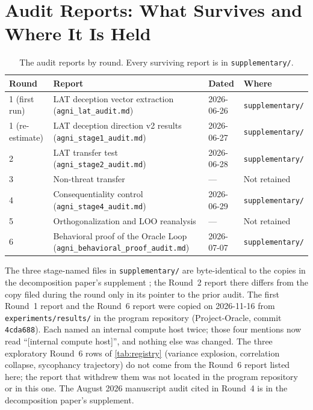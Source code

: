 \documentclass[11pt,letterpaper]{article}
\begin{document}
\appendix
\section{Audit Reports: What Survives and Where It Is Held}\label{app:audits}

\begin{table}[H]
  \centering
  \small
  \caption{The audit reports by round. Every surviving report is in \texttt{supplementary/}.}
  \label{tab:audits}
  \begin{tabular}{@{}p{2.2cm}>{\raggedright\arraybackslash}p{6.4cm}p{1.9cm}>{\raggedright\arraybackslash}p{3.6cm}@{}}
    \toprule
    \textbf{Round} & \textbf{Report} & \textbf{Dated} & \textbf{Where} \\
    \midrule
    1 (first run) & LAT deception vector extraction (\texttt{agni\_lat\_audit.md}) & 2026-06-26 &
      \texttt{supplementary/} \\
    1 (re-estimate) & LAT deception direction v2 results (\texttt{agni\_stage1\_audit.md}) &
      2026-06-27 & \texttt{supplementary/} \\
    2 & LAT transfer test (\texttt{agni\_stage2\_audit.md}) & 2026-06-28 & \texttt{supplementary/} \\
    3 & Non-threat transfer & --- & Not retained \\
    4 & Consequentiality control (\texttt{agni\_stage4\_audit.md}) & 2026-06-29 &
      \texttt{supplementary/} \\
    5 & Orthogonalization and LOO reanalysis & --- & Not retained \\
    6 & Behavioral proof of the Oracle Loop (\texttt{agni\_behavioral\_proof\_audit.md}) & 2026-07-07 &
      \texttt{supplementary/} \\
    \bottomrule
  \end{tabular}
\end{table}

The three stage-named files in \texttt{supplementary/} are byte-identical to the copies in the
decomposition paper's supplement \cite{cc2026composites}; the Round~2 report there differs from the
copy filed during the round only in its pointer to the prior audit. The first Round~1 report and the
Round~6 report were copied on 2026-11-16 from \texttt{experiments/results/} in the program repository
(Project-Oracle, commit \texttt{4cda688}). Each named an internal compute host twice; those four
mentions now read ``[internal compute host]'', and nothing else was changed. The three
exploratory Round~6 rows of \cref{tab:registry} (variance explosion, correlation collapse, sycophancy
trajectory) do not come from the Round~6 report listed here; the report that withdrew them was not
located in the program repository or in this one. The August 2026 manuscript audit cited in Round~4
is in the decomposition paper's supplement.
\end{document}
